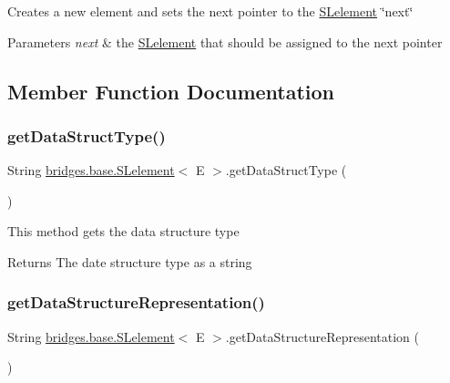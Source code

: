 Creates a new element and sets the next pointer to the \hyperlink{classbridges_1_1base_1_1_s_lelement}{S\+Lelement} \char`\"{}next\char`\"{} 
\begin{DoxyParams}{Parameters}
{\em next} & the \hyperlink{classbridges_1_1base_1_1_s_lelement}{S\+Lelement} that should be assigned to the next pointer \\
\hline
\end{DoxyParams}


\subsection{Member Function Documentation}
\mbox{\label{classbridges_1_1base_1_1_s_lelement_a8c48a2d34b238fa0ae7bf2d1ee58ea88}} 
\subsubsection{\texorpdfstring{get\+Data\+Struct\+Type()}{getDataStructType()}}
{\footnotesize\ttfamily String \hyperlink{classbridges_1_1base_1_1_s_lelement}{bridges.\+base.\+S\+Lelement}$<$ E $>$.get\+Data\+Struct\+Type (\begin{DoxyParamCaption}{ }\end{DoxyParamCaption})}

This method gets the data structure type

\begin{DoxyReturn}{Returns}
The date structure type as a string 
\end{DoxyReturn}
\mbox{\label{classbridges_1_1base_1_1_s_lelement_a2928f5e8640deaceeecf01adcd75669b}} 
\subsubsection{\texorpdfstring{get\+Data\+Structure\+Representation()}{getDataStructureRepresentation()}}
{\footnotesize\ttfamily String \hyperlink{classbridges_1_1base_1_1_s_lelement}{bridges.\+base.\+S\+Lelement}$<$ E $>$.get\+Data\+Structure\+Representation (\begin{DoxyParamCaption}{ }\end{DoxyParamCaption})}

